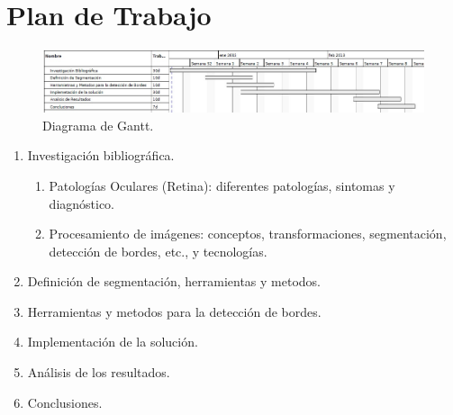 \documentclass[14pt]{article}
\begin{document}
\section{Plan de Trabajo}


\begin{figure}[h]
	\begin{center}
		\includegraphics[scale=.5]{./Imagenes/Gantt.jpg}
		\caption{Diagrama de Gantt.}
	\end{center}
\end{figure} 



\begin{enumerate}
	\item Investigación bibliográfica.
		\begin{enumerate}
			\item Patologías Oculares (Retina): diferentes patologías, sintomas y diagnóstico.
			\item Procesamiento de imágenes: conceptos, transformaciones, segmentación, detección de bordes, etc., y tecnologías.
		\end{enumerate}
	\item Definición de segmentación, herramientas y metodos.
	\item Herramientas y metodos para la detección de bordes.
	\item Implementación de la solución.
    \item Análisis de los resultados.
	\item Conclusiones.
\end{enumerate}
\end{document}
